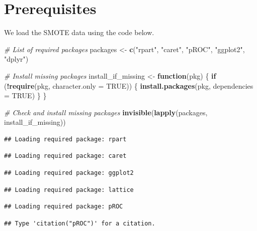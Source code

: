 \documentclass[
]{article}
\newenvironment{Shaded}{\begin{snugshade}}{\end{snugshade}}
\newcommand{\AttributeTok}[1]{\textcolor[rgb]{0.13,0.29,0.53}{#1}}
\newcommand{\CommentTok}[1]{\textcolor[rgb]{0.56,0.35,0.01}{\textit{#1}}}
\newcommand{\ConstantTok}[1]{\textcolor[rgb]{0.56,0.35,0.01}{#1}}
\newcommand{\ControlFlowTok}[1]{\textcolor[rgb]{0.13,0.29,0.53}{\textbf{#1}}}
\newcommand{\FunctionTok}[1]{\textcolor[rgb]{0.13,0.29,0.53}{\textbf{#1}}}
\newcommand{\NormalTok}[1]{#1}
\newcommand{\OtherTok}[1]{\textcolor[rgb]{0.56,0.35,0.01}{#1}}
\newcommand{\SpecialCharTok}[1]{\textcolor[rgb]{0.81,0.36,0.00}{\textbf{#1}}}
\newcommand{\StringTok}[1]{\textcolor[rgb]{0.31,0.60,0.02}{#1}}
\begin{document}
\section{Prerequisites}\label{prerequisites}

We load the SMOTE data using the code below.

\begin{Shaded}
\begin{Highlighting}[]
\CommentTok{\# List of required packages}
\NormalTok{packages }\OtherTok{\textless{}{-}} \FunctionTok{c}\NormalTok{(}\StringTok{"rpart"}\NormalTok{, }\StringTok{"caret"}\NormalTok{, }\StringTok{"pROC"}\NormalTok{, }\StringTok{"ggplot2"}\NormalTok{, }\StringTok{"dplyr"}\NormalTok{)}

\CommentTok{\# Install missing packages}
\NormalTok{install\_if\_missing }\OtherTok{\textless{}{-}} \ControlFlowTok{function}\NormalTok{(pkg) \{}
  \ControlFlowTok{if}\NormalTok{ (}\SpecialCharTok{!}\FunctionTok{require}\NormalTok{(pkg, }\AttributeTok{character.only =} \ConstantTok{TRUE}\NormalTok{)) \{}
    \FunctionTok{install.packages}\NormalTok{(pkg, }\AttributeTok{dependencies =} \ConstantTok{TRUE}\NormalTok{)}
\NormalTok{  \}}
\NormalTok{\}}

\CommentTok{\# Check and install missing packages}
\FunctionTok{invisible}\NormalTok{(}\FunctionTok{lapply}\NormalTok{(packages, install\_if\_missing))}
\end{Highlighting}
\end{Shaded}

\begin{verbatim}
## Loading required package: rpart
\end{verbatim}

\begin{verbatim}
## Loading required package: caret
\end{verbatim}

\begin{verbatim}
## Loading required package: ggplot2
\end{verbatim}

\begin{verbatim}
## Loading required package: lattice
\end{verbatim}

\begin{verbatim}
## Loading required package: pROC
\end{verbatim}

\begin{verbatim}
## Type 'citation("pROC")' for a citation.
\end{verbatim}
\end{document}
